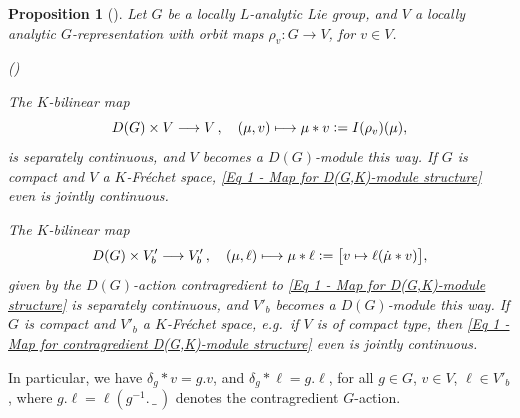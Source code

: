 \documentclass[a4paper, reqno, 10pt]{amsart}
\newtheorem{proposition}[theorem]{Proposition}
\theoremstyle{definition}
\newenvironment{altenumerate}
	{\begin{list}
		{\textup{(\theenumi)} }
		{\usecounter{enumi}
			\setlength{\labelwidth}{0pt}
			\setlength{\labelsep}{0pt}
			\setlength{\leftmargin}{0pt}
			\setlength{\itemsep}{0pt}
			\setlength{\topsep}{0pt}
		\renewcommand{\theenumi}{\roman{enumi}}
		}}
	{\end{list}}
\numberwithin{equation}{section}
\newcommand{\blank}{{\,\_\,}}
\newcommand{\defeq}{\vcentcolon=}
\newcommand{\lra}{\longrightarrow}
\newcommand{\lto}{\longmapsto}
\newcommand{\mto}{\mapsto}
\newcommand{\ra}{\rightarrow}
\begin{document}
\begin{proposition}[{\cite[Prop.\ 3.2]{SchneiderTeitelbaum02LocAnDistApplToGL2}}]\label{Prop 1 - Module structures over the distribution algebra}
	Let $G$ be a locally $L$-analytic Lie group, and $V$ a locally analytic $G$-re\-pre\-sen\-tation with orbit maps $\rho_v \colon G \ra V$, for $v\in V$.
	\begin{altenumerate}
		\item
		The $K$-bilinear map
		\begin{equation}\label{Eq 1 - Map for D(G,K)-module structure}
			D(G) \times V \lra V \,,\quad (\mu,v) \lto \mu \ast v \defeq I(\rho_v)(\mu),
		\end{equation}
		is separately continuous, and $V$ becomes a $D(G)$-module this way.
		If $G$ is compact and $V$ a $K$-Fr\'echet space, \eqref{Eq 1 - Map for D(G,K)-module structure} even is jointly continuous.
		\item
		The $K$-bilinear map
		\begin{equation}\label{Eq 1 - Map for contragredient D(G,K)-module structure}
			D(G) \times V'_b \lra V'_b \,,\quad (\mu,\ell) \lto \mu \ast \ell \defeq \big[v\mto \ell(\dot{\mu} \ast v) \big],
		\end{equation}
		given by the $D(G)$-action contragredient to \eqref{Eq 1 - Map for D(G,K)-module structure} is separately continuous, and $V'_b$ becomes a $D(G)$-module this way.
		If $G$ is compact and $V'_b$ a $K$-Fr\'echet space, e.g.\ if $V$ is of compact type, then \eqref{Eq 1 - Map for contragredient D(G,K)-module structure} even is jointly continuous.
	\end{altenumerate}
\end{proposition}

In particular, we have $\delta_g \ast v = g.v$, and $\delta_g \ast \ell = g.\ell$, for all $g\in G$, $v\in V$, $\ell \in V'_b$, where $g.\ell = \ell( g^{-1}.\blank)$ denotes the contragredient $G$-action.
\end{document}
